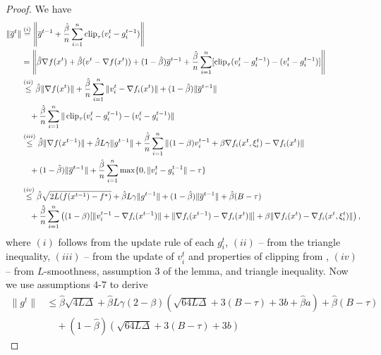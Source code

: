 \documentclass[a4paper,11pt]{article}
\begin{document}
\begin{proof}
    We have 
    \begin{align*}
        \|\overline{g}^{t}\| &\overset{(i)}{=} \left\|\overline{g}^{t-1} + \frac{\hat{\beta}}{n}\sum_{i=1}^n \operatorname{clip}_{\tau}(v_i^t - g_i^{t-1})\right\|\\
        &= \left\|\hat{\beta}\nabla f(x^t) 
        + \hat{\beta}(v^t - \nabla f(x^t))
        + (1-\hat{\beta})\overline{g}^{t-1}
        + \frac{\hat{\beta}}{n}\sum_{i=1}^n [\operatorname{clip}_{\tau}(v_i^t - g_i^{t-1}) - (v_i^t - g_i^{t-1})] \right\|\\
        &\overset{(ii)}{\le} \hat{\beta}\|\nabla f(x^t)\|
        + \frac{\hat{\beta}}{n}\sum_{i=1}^n\|v_i^t - \nabla f_i(x^t)\|
        + (1-\hat{\beta})\|\overline{g}^{t-1}\|\\
        &\quad + \frac{\hat{\beta}}{n}\sum_{i=1}^n\|\operatorname{clip}_{\tau}(v_i^t - g_i^{t-1}) - (v_i^t - g_i^{t-1})\|\\
        &\overset{(iii)}{\le} \hat{\beta}\|\nabla f(x^{t-1})\|
        + \hat{\beta}L\gamma\|g^{t-1}\|
        + \frac{\hat{\beta}}{n}\sum_{i=1}^n\|(1-\beta)v_i^{t-1} + \beta \nabla f_i(x^t, \xi^{t}_i) - \nabla f_i(x^t)\|\\
        &\quad + (1-\hat{\beta})\|\overline{g}^{t-1}\|
        + \frac{\hat{\beta}}{n}\sum_{i=1}^n\max\{0, \|v_i^t - g_i^{t-1}\| - \tau\}\\
        &\overset{(iv)}{\le} \hat{\beta}\sqrt{2L(f(x^{t-1})  -f^*)}
        + \hat{\beta}L\gamma\|g^{t-1}\|
        + (1-\hat{\beta})\|\overline{g}^{t-1}\|
        + \hat{\beta}(B-\tau)\\
        &\quad + \frac{\hat{\beta}}{n}\sum_{i=1}^n\left((1-\beta) [\|v_i^{t-1} - \nabla f_i(x^{t-1})\|
        + \|\nabla f_i(x^{t-1}) - \nabla f_i(x^t) \|]
        + \beta\|\nabla f_i(x^t) - \nabla f_i(x^t, \xi^t_i)\|\right),
    \end{align*}
    where $(i)$ follows from the update rule of each $g_i^t$, $(ii)$ -- from the triangle inequality, $(iii)$ -- from the update of $v_i^t$ and properties of clipping from , $(iv)$ -- from $L$-smoothness, assumption $3$ of the lemma, and triangle inequality. Now we use assumptions $4$-$7$ to derive
    \begin{align*}
        \|g^t\| &\le \hat{\beta}\sqrt{4L\Delta}
        + \hat{\beta}L\gamma(2-\beta)\left(\sqrt{64L\Delta} + 3(B-\tau) + 3b + \hat{\beta}a\right)
        + \hat{\beta}(B-\tau)\\
        &\quad + (1-\hat{\beta})\left(\sqrt{64L\Delta} + 3(B-\tau) + 3b\right)

\end{align*}
\end{proof}
\end{document}
